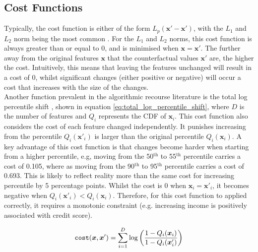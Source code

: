\subsection{Cost Functions}

Typically, the cost function is either of the form $L_p(\boldsymbol{x}'-\boldsymbol{x}')$, with the $L_1$ and $L_2$ norm being the most common \citep{ramakrishnanSynthesizingActionSequences2020, karimiSurveyAlgorithmicRecourse2022}. For the $L_1$ and $L_2$ norms, this cost function is always greater than or equal to 0, and is minimised when $\boldsymbol{x} =\boldsymbol{x}'$. The further away from the original features $\boldsymbol{x}$ that the counterfactual values $\boldsymbol{x}'$ are, the higher the cost. Intuitively, this means that leaving the features unchanged will result in a cost of 0, whilst significant changes (either positive or negative) will occur a cost that increases with the size of the changes.\\

Another function prevalent in the algorithmic recourse literature is the total log percentile shift \citep{ustunActionableRecourseLinear2019}, shown in equation \ref{eq:total_log_percentile_shift}, where $D$ is the number of features and $Q_i$ represents the CDF of $\boldsymbol{x}_i$. This cost function also considers the cost of each feature changed independently. It punishes increasing from the percentile $Q_i(\boldsymbol{x}'_i)$ is larger than the original percentile $Q_i(\boldsymbol{x}_i)$. A key advantage of this cost function is that changes become harder when starting from a higher percentile, e.g, moving from the 50$^{\text{th}}$ to 55$^{\text{th}}$ percentile carries a cost of 0.105, where as moving from the 90$^{\text{th}}$ to 95$^{\text{th}}$ percentile carries a cost of 0.693. This is likely to reflect reality more than the same cost for increasing percentile by 5 percentage points. Whilst the cost is 0 when $\boldsymbol{x}_i = \boldsymbol{x}'_i$, it becomes negative when $Q_i(\boldsymbol{x}'_i) < Q_i(\boldsymbol{x}_i)$. Therefore, for this cost function to applied correctly, it requires a monotonic constraint (e.g. increasing income is positively associated with credit score).

\begin{equation} \label{eq:total_log_percentile_shift}
	\operatorname*{\texttt{cost}}(\boldsymbol{x}, \boldsymbol{x}') = \sum_{i=1}^D \log \bigg( \frac{1 - Q_i(\boldsymbol{x}_i)}{1 - Q_i(\boldsymbol{x}_i')} \bigg)
\end{equation}

